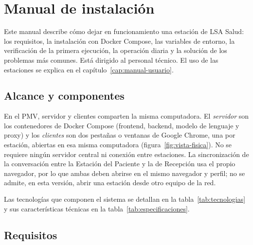 \chapter{Manual de instalación}\label{cap:manual-instalacion}

Este manual describe cómo dejar en funcionamiento una estación de LSA Salud: los requisitos, la instalación con Docker Compose, las variables de entorno, la verificación de la primera ejecución, la operación diaria y la solución de los problemas más comunes. Está dirigido al personal técnico. El uso de las estaciones se explica en el capítulo~\ref{cap:manual-usuario}.

\section{Alcance y componentes}

En el PMV, servidor y clientes comparten la misma computadora. El \emph{servidor} son los contenedores de Docker Compose (frontend, backend, modelo de lenguaje y proxy) y los \emph{clientes} son dos pestañas o ventanas de Google Chrome, una por estación, abiertas en esa misma computadora (figura~\ref{fig:vista-fisica}). No se requiere ningún servidor central ni conexión entre estaciones. La sincronización de la conversación entre la Estación del Paciente y la de Recepción usa el propio navegador, por lo que ambas deben abrirse en el mismo navegador y perfil; no se admite, en esta versión, abrir una estación desde otro equipo de la red.

Las tecnologías que componen el sistema se detallan en la tabla~\ref{tab:tecnologias} y sus características técnicas en la tabla~\ref{tab:especificaciones}.

\section{Requisitos}

